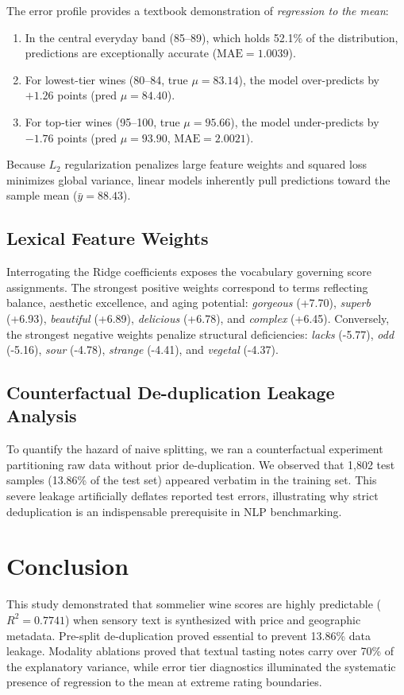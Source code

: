 \documentclass[conference]{IEEEtran}
\begin{document}
The error profile provides a textbook demonstration of \textit{regression to the mean}:
\begin{enumerate}
    \item In the central everyday band (85--89), which holds 52.1\% of the distribution, predictions are exceptionally accurate ($\text{MAE} = 1.0039$).
    \item For lowest-tier wines (80--84, true $\mu = 83.14$), the model over-predicts by $+1.26$ points ($\text{pred } \mu = 84.40$).
    \item For top-tier wines (95--100, true $\mu = 95.66$), the model under-predicts by $-1.76$ points ($\text{pred } \mu = 93.90$, $\text{MAE} = 2.0021$).
\end{enumerate}
Because $L_2$ regularization penalizes large feature weights and squared loss minimizes global variance, linear models inherently pull predictions toward the sample mean ($\bar{y} = 88.43$).

\subsection{Lexical Feature Weights}
Interrogating the Ridge coefficients exposes the vocabulary governing score assignments. The strongest positive weights correspond to terms reflecting balance, aesthetic excellence, and aging potential: \textit{gorgeous} (+7.70), \textit{superb} (+6.93), \textit{beautiful} (+6.89), \textit{delicious} (+6.78), and \textit{complex} (+6.45). Conversely, the strongest negative weights penalize structural deficiencies: \textit{lacks} (-5.77), \textit{odd} (-5.16), \textit{sour} (-4.78), \textit{strange} (-4.41), and \textit{vegetal} (-4.37).

\subsection{Counterfactual De-duplication Leakage Analysis}
To quantify the hazard of naive splitting, we ran a counterfactual experiment partitioning raw data without prior de-duplication. We observed that 1,802 test samples (13.86\% of the test set) appeared verbatim in the training set. This severe leakage artificially deflates reported test errors, illustrating why strict deduplication is an indispensable prerequisite in NLP benchmarking.

\section{Conclusion}
This study demonstrated that sommelier wine scores are highly predictable ($R^2 = 0.7741$) when sensory text is synthesized with price and geographic metadata. Pre-split de-duplication proved essential to prevent 13.86\% data leakage. Modality ablations proved that textual tasting notes carry over 70\% of the explanatory variance, while error tier diagnostics illuminated the systematic presence of regression to the mean at extreme rating boundaries.
\end{document}
